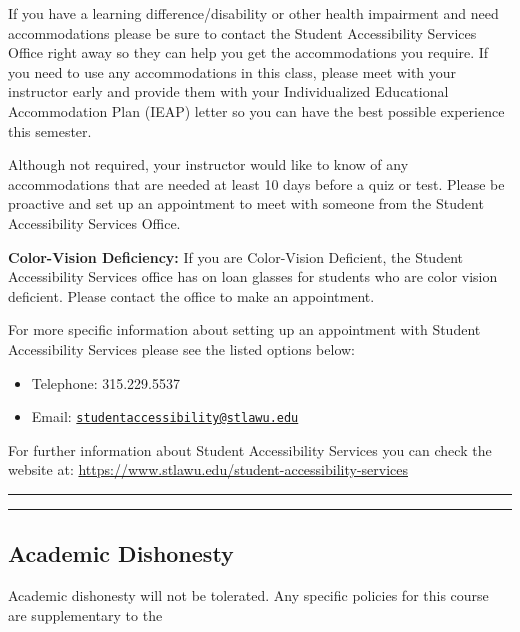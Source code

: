 \documentclass[
]{book}
\providecommand{\tightlist}{%
  \setlength{\itemsep}{0pt}\setlength{\parskip}{0pt}}
\begin{document}
If you have a learning difference/disability or other health impairment and need accommodations please be sure to contact the Student Accessibility Services Office right away so they can help you get the accommodations you require. If you need to use any accommodations in this class, please meet with your instructor early and provide them with your Individualized Educational Accommodation Plan (IEAP) letter so you can have the best possible experience this semester.

Although not required, your instructor would like to know of any accommodations that are needed at least 10 days before a quiz or test. Please be proactive and set up an appointment to meet with someone from the Student Accessibility Services Office.

\textbf{Color-Vision Deficiency:} If you are Color-Vision Deficient, the Student Accessibility Services office has on loan glasses for students who are color vision deficient. Please contact the office to make an appointment.

For more specific information about setting up an appointment with Student Accessibility Services please see the listed options below:

\begin{itemize}
\tightlist
\item
  Telephone: 315.229.5537
\item
  Email: \href{mailto:studentaccessibility@stlawu.edu}{\nolinkurl{studentaccessibility@stlawu.edu}}
\end{itemize}

For further information about Student Accessibility Services you can check the website at: \url{https://www.stlawu.edu/student-accessibility-services}

\begin{center}\rule{0.5\linewidth}{0.5pt}\end{center}

\begin{center}\rule{0.5\linewidth}{0.5pt}\end{center}

\hypertarget{academic-dishonesty}{%
\subsection{Academic Dishonesty}\label{academic-dishonesty}}

Academic dishonesty will not be tolerated. Any specific policies for this course are supplementary to the
\end{document}
